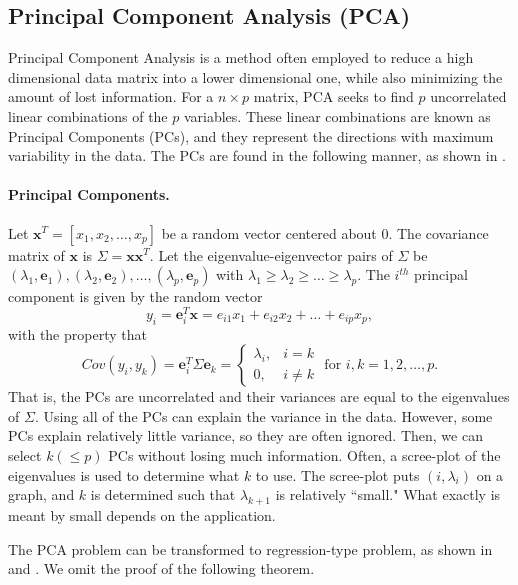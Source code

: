 \documentclass{article}
\begin{document}
\subsection{Principal Component Analysis (PCA)}
Principal Component Analysis is a method often employed to reduce a high dimensional data matrix into a lower dimensional one, while also minimizing the amount of lost information. For a $n \times p$ matrix, PCA seeks to find $p$ uncorrelated linear combinations of the $p$ variables. These linear combinations are known as Principal Components (PCs), and they represent the directions with maximum variability in the data. The PCs are found in the following manner, as shown in \cite{multivariate}.

\paragraph{Principal Components.} Let $\boldsymbol{x}^T=[x_1, x_2, \ldots, x_p]$ be a random vector centered about 0. The covariance matrix of $\boldsymbol{x}$ is $\Sigma=\boldsymbol{x}\boldsymbol{x}^T$. Let the eigenvalue-eigenvector pairs of $\Sigma$ be $(\lambda_1, \boldsymbol{e}_1), (\lambda_2, \boldsymbol{e}_2), \ldots, (\lambda_p, \boldsymbol{e}_p)$ with $\lambda_1 \ge \lambda_2 \ge \ldots \ge \lambda_p$. The $i^{th}$ principal component is given by the random vector
$$y_i=\boldsymbol{e}_i^T\boldsymbol{x}=e_{i1}x_1+e_{i2}x_2+\ldots+e_{ip}x_p,$$
with the property that
$$Cov(y_i, y_k)=\boldsymbol{e}_i^T\Sigma\boldsymbol{e}_k=
\begin{cases}
\lambda_i, & i= k\\
0, & i\neq k
\end{cases} \text{   for } i,k=1, 2, \ldots, p.$$
That is, the PCs are uncorrelated and their variances are equal to the eigenvalues of $\Sigma$. Using all of the PCs can explain the variance in the data. However, some PCs explain relatively little variance, so they are often ignored. Then, we can select $k (\leq p)$ PCs without losing much information. Often, a scree-plot of the eigenvalues is used to determine what $k$ to use. The scree-plot puts $(i,\lambda_i)$ on a graph, and $k$ is determined such that $\lambda_{k+1}$ is relatively ``small." What exactly is meant by small depends on the application.

The PCA problem can be transformed to regression-type problem, as shown in \cite{spca_reference} and \cite{element}. We omit the proof of the following theorem.\\
\par
\end{document}
